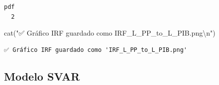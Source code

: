 \documentclass[
  spanish,
  letterpaper,
  DIV=11,
  numbers=noendperiod]{scrartcl}
\newenvironment{Shaded}{\begin{snugshade}}{\end{snugshade}}
\newcommand{\FunctionTok}[1]{\textcolor[rgb]{0.28,0.35,0.67}{#1}}
\newcommand{\NormalTok}[1]{\textcolor[rgb]{0.00,0.23,0.31}{#1}}
\newcommand{\SpecialCharTok}[1]{\textcolor[rgb]{0.37,0.37,0.37}{#1}}
\newcommand{\StringTok}[1]{\textcolor[rgb]{0.13,0.47,0.30}{#1}}
\begin{document}
\begin{verbatim}
pdf 
  2 
\end{verbatim}

\begin{Shaded}
\begin{Highlighting}[]
\FunctionTok{cat}\NormalTok{(}\StringTok{"✅ Gráfico IRF guardado como \textquotesingle{}IRF\_L\_PP\_to\_L\_PIB.png\textquotesingle{}}\SpecialCharTok{\textbackslash{}n}\StringTok{"}\NormalTok{)}
\end{Highlighting}
\end{Shaded}

\begin{verbatim}
✅ Gráfico IRF guardado como 'IRF_L_PP_to_L_PIB.png'
\end{verbatim}

\subsection{\texorpdfstring{\textbf{Modelo
SVAR}}{Modelo SVAR}}\label{modelo-svar}
\end{document}

